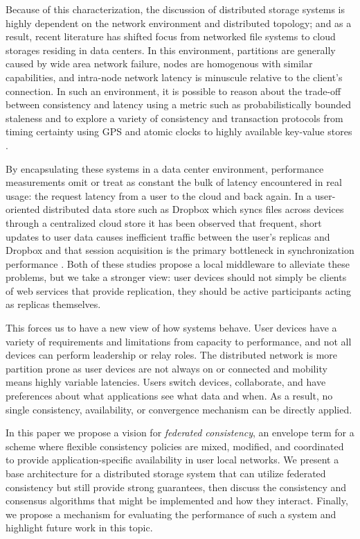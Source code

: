 \documentclass[letterpaper,twocolumn,10pt]{article}
\begin{document}
Because of this characterization, the discussion of distributed storage systems is highly dependent on the network environment and distributed topology; and as a result, recent literature has shifted focus from networked file systems to cloud storages residing in data centers. In this environment, partitions are generally caused by wide area network failure, nodes are homogenous with similar capabilities, and intra-node network latency is minuscule relative to the client's connection. In such an environment, it is possible to reason about the trade-off between consistency and latency using a metric such as probabilistically bounded staleness \cite{bailis_quantifying_2014} and to explore a variety of consistency and transaction protocols from timing certainty using GPS and atomic clocks \cite{corbett_spanner_2013} to highly available key-value stores \cite{decandia_dynamo_2007}.


By encapsulating these systems in a data center environment, performance measurements omit or treat as constant the bulk of latency encountered in real usage: the request latency from a user to the cloud and back again. In a user-oriented distributed data store such as Dropbox which syncs files across devices through a centralized cloud store it has been observed that frequent, short updates to user data causes inefficient traffic between the user's replicas and Dropbox \cite{li_efficient_2013} and that session acquisition is the primary bottleneck in synchronization performance \cite{drago_inside_2012}. Both of these studies propose a local middleware to alleviate these problems, but we take a stronger view: user devices should not simply be clients of web services that provide replication, they should be active participants acting as replicas themselves.

This forces us to have a new view of how systems behave. User devices have a variety of requirements and limitations from capacity to performance, and not all devices can perform leadership or relay roles. The distributed network is more partition prone as user devices are not always on or connected and mobility means highly variable latencies. Users switch devices, collaborate, and have preferences about what applications see what data and when. As a result, no single consistency, availability, or convergence mechanism can be directly applied.

In this paper we propose a vision for \textit{federated consistency}, an envelope term for a scheme where flexible consistency policies are mixed, modified, and coordinated to provide application-specific availability in user local networks. We present a base architecture for a distributed storage system that can utilize federated consistency but still provide strong guarantees, then discuss the consistency and consensus algorithms that might be implemented and how they interact. Finally, we propose a mechanism for evaluating the performance of such a system and highlight future work in this topic.
\end{document}
